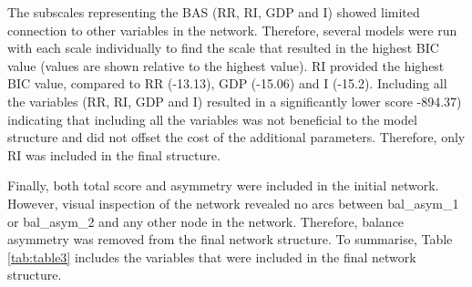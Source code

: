 \documentclass[utf8]{frontiersHLTH}
\begin{document}
The subscales representing the BAS (RR, RI, GDP and I) showed limited
connection to other variables in the network. Therefore, several models
were run with each scale individually to find the scale that resulted in
the highest BIC value (values are shown relative to the highest value).
RI provided the highest BIC value, compared to RR (-13.13), GDP (-15.06)
and I (-15.2). Including all the variables (RR, RI, GDP and I) resulted
in a significantly lower score -894.37) indicating that including all
the variables was not beneficial to the model structure and did not
offset the cost of the additional parameters. Therefore, only RI was
included in the final structure.

Finally, both total score and asymmetry were included in the initial
network. However, visual inspection of the network revealed no arcs
between bal\_asym\_1 or bal\_asym\_2 and any other node in the network.
Therefore, balance asymmetry was removed from the final network
structure. To summarise, Table \ref{tab:table3} includes the variables
that were included in the final network structure.
\end{document}
